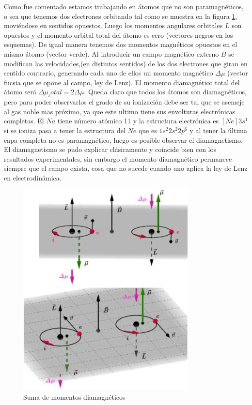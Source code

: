 Como fue comentado estamos trabajando en átomos que no son paramagnéticos, o sea que tenemos dos electrones orbitando tal como se muestra en la figura \ref{fig:s18}, moviéndose en sentidos opuestos. Luego los momentos angulares orbitales $L$ son opuestos y el momento orbital total del átomo es cero (vectores negros en los esquemas). De igual manera tenemos dos momentos magnéticos opuestos en el mismo átomo (vector verde). Al introducir un campo magnético externo $B$ se modifican las velocidades,(en distintos sentidos) de los dos electrones que giran en sentido contrario, generando cada uno de ellos un momento magnético $\Delta\mu$ (vector fucsia que se opone al campo, ley de Lenz). El momento diamagnético total del átomo será $\Delta\mu_total = 2\Delta\mu$. Queda claro que todos los átomos son diamagnéticos, pero para poder observarlos el grado de su ionización debe ser tal que se asemeje al gas noble mas próximo, ya que este ultimo tiene sus envolturas electrónicas completas. El $Na$ tiene número atómico 11 y la estructura electrónica es $[Ne]3s^{1}$ si se ioniza pasa a tener la estructura del $Ne$ que es $1s^{2}2s^{2}2p^{6}$ y al tener la última capa completa no es paramagnético, luego es posible observar el diamagnetismo. El diamagnetismo se pudo explicar clásicamente y coincide bien con los resultados experimentales, sin embargo el momento diamagnético permanece siempre que el campo exista, cosa que no sucede cuando uno aplica la ley de Lenz en electrodinámica.


\begin{figure}[H]
    \centering
    \includegraphics[width=0.8\textwidth]{./Figures/fig_s18}
	\caption{Suma de momentos diamagnéticos}
	\label{fig:s18}
\end{figure}

